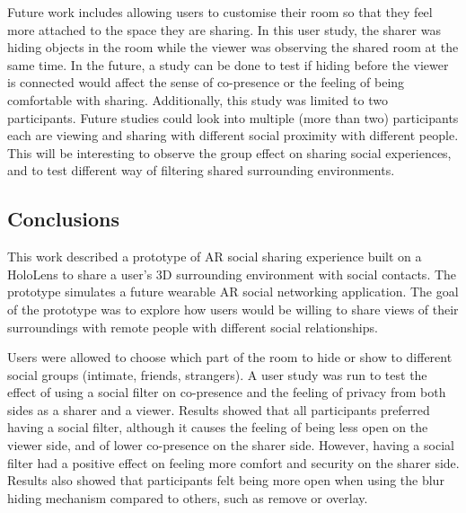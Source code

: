 Future work includes allowing users to customise their room so that they feel more attached to the space they are sharing. In this user study, the sharer was hiding objects in the room while the viewer was observing the shared room at the same time. In the future, a study can be done to test if hiding before the viewer is connected would affect the sense of co-presence or the feeling of being comfortable with sharing. Additionally, this study was limited to two participants. Future studies could look into multiple (more than two) participants each are viewing and sharing with different social proximity with different people. This will be interesting to observe the group effect on sharing social experiences, and to test different way of filtering shared surrounding environments. 


\subsection{Conclusions}

This work described a prototype of AR social sharing experience built on a HoloLens to share a user's 3D surrounding environment with social contacts. The prototype simulates a future wearable AR social networking application. The goal of the prototype was to explore how users would be willing to share views of their surroundings with remote people with different social relationships. 

Users were allowed to choose which part of the room to hide or show to different social groups (intimate, friends, strangers). A user study was run to test the effect of using a social filter on co-presence and the feeling of privacy from both sides as a sharer and a viewer. Results showed that all participants preferred having a social filter, although it causes the feeling of being less open on the viewer side, and of lower co-presence on the sharer side. However, having a social filter had a positive effect on feeling more comfort and security on the sharer side. Results also showed that participants felt being more open when using the blur hiding mechanism compared to others, such as remove or overlay. 
